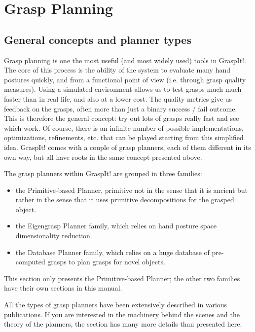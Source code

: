 \section{Grasp Planning}


\subsection{General concepts and planner types}

Grasp planning is one the most useful (and most widely used) tools in
GraspIt!. The core of this process is the ability of the system to
evaluate many hand postures quickly, and from a functional point of
view (i.e. through grasp quality measures). Using a simulated
environment allows us to test grasps much much faster than in real
life, and also at a lower cost. The quality metrics give us feedback
on the grasps, often more than just a binary success / fail
outcome. This is therefore the general concept: try out lots of grasps
really fast and see which work. Of course, there is an infinite number
of possible implementations, optimizations, refinements, etc. that can
be played starting from this simplified idea. GraspIt! comes with a
couple of grasp planners, each of them different in its own way, but
all have roots in the same concept presented above.

The grasp planners within GraspIt! are grouped in three families:
\begin{itemize}
\item the Primitive-based Planner, primitive not in the sense that it
  is ancient but rather in the sense that it uses primitive
  decompositions for the grasped object.
\item the Eigengrasp Planner family, which relies on hand posture
  space dimensionality reduction.
\item the Database Planner family, which relies on a huge database of
  pre-computed grasps to plan grasps for novel objects.
\end{itemize}

This section only presents the Primitive-based Planner; the other two
families have their own sections in this manual.

All the types of grasp planners have been extensively described in
various publications. If you are interested in the machinery behind
the scenes and the theory of the planners, the
 section has many more details
than presented here.

